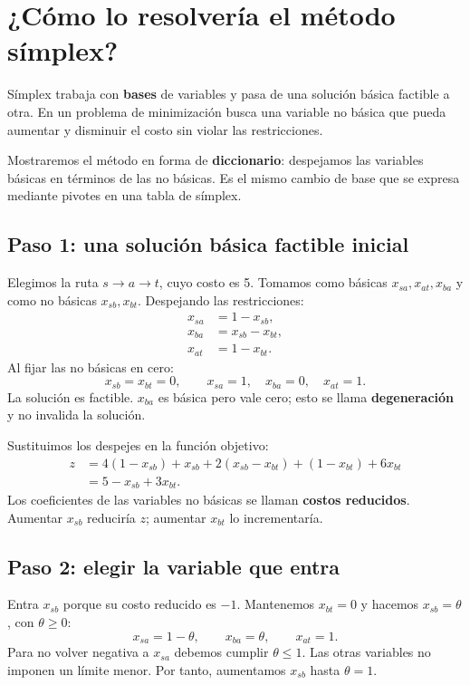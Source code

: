 \documentclass[11pt,letterpaper]{article}
\begin{document}
\section{¿Cómo lo resolvería el método símplex?}
Símplex trabaja con \textbf{bases} de variables y pasa de una solución básica factible a otra. En un problema de minimización busca una variable no básica que pueda aumentar y disminuir el costo sin violar las restricciones.

Mostraremos el método en forma de \textbf{diccionario}: despejamos las variables básicas en términos de las no básicas. Es el mismo cambio de base que se expresa mediante pivotes en una tabla de símplex.

\subsection{Paso 1: una solución básica factible inicial}
Elegimos la ruta $s\to a\to t$, cuyo costo es 5. Tomamos como básicas $x_{sa},x_{at},x_{ba}$ y como no básicas $x_{sb},x_{bt}$. Despejando las restricciones:
\[
\begin{aligned}
x_{sa}&=1-x_{sb},\\
x_{ba}&=x_{sb}-x_{bt},\\
x_{at}&=1-x_{bt}.
\end{aligned}
\]
Al fijar las no básicas en cero:
\[
x_{sb}=x_{bt}=0,\qquad x_{sa}=1,\quad x_{ba}=0,\quad x_{at}=1.
\]
La solución es factible. $x_{ba}$ es básica pero vale cero; esto se llama \textbf{degeneración} y no invalida la solución.

Sustituimos los despejes en la función objetivo:
\begin{align*}
z&=4(1-x_{sb})+x_{sb}+2(x_{sb}-x_{bt})+(1-x_{bt})+6x_{bt}\\
 &=\boxed{5-x_{sb}+3x_{bt}}.
\end{align*}
Los coeficientes de las variables no básicas se llaman \textbf{costos reducidos}. Aumentar $x_{sb}$ reduciría $z$; aumentar $x_{bt}$ lo incrementaría.

\subsection{Paso 2: elegir la variable que entra}
Entra $x_{sb}$ porque su costo reducido es $-1$. Mantenemos $x_{bt}=0$ y hacemos $x_{sb}=\theta$, con $\theta\geq0$:
\[
x_{sa}=1-\theta,\qquad x_{ba}=\theta,\qquad x_{at}=1.
\]
Para no volver negativa a $x_{sa}$ debemos cumplir $\theta\leq1$. Las otras variables no imponen un límite menor. Por tanto, aumentamos $x_{sb}$ hasta $\theta=1$.
\end{document}
